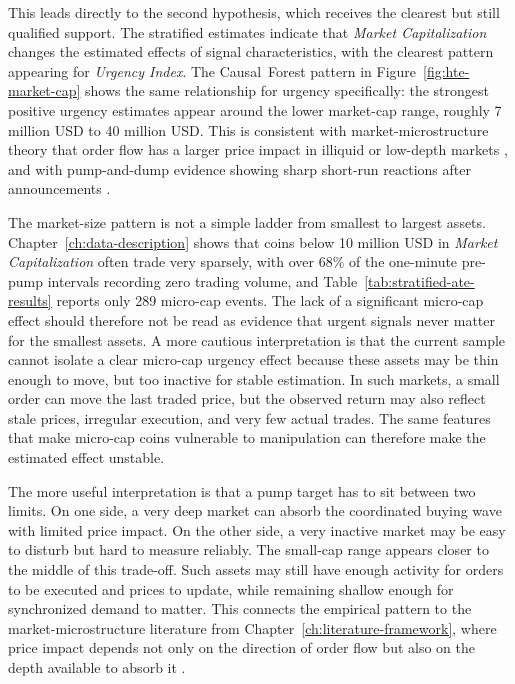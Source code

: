 This leads directly to the second hypothesis, which receives the clearest but still qualified support. The stratified estimates indicate that \textit{Market Capitalization} changes the estimated effects of signal characteristics, with the clearest pattern appearing for \textit{Urgency Index}. The Causal~Forest pattern in Figure~\ref{fig:hte-market-cap} shows the same relationship for urgency specifically: the strongest positive urgency estimates appear around the lower market-cap range, roughly 7 million USD to 40 million USD. This is consistent with market-microstructure theory that order flow has a larger price impact in illiquid or low-depth markets \cite{amihud2002illiquidity, kyle1985continuous}, and with pump-and-dump evidence showing sharp short-run reactions after announcements \cite{li2021cryptocurrency, hamrick2021examination}.

The market-size pattern is not a simple ladder from smallest to largest assets. Chapter~\ref{ch:data-description} shows that coins below 10 million USD in \textit{Market Capitalization} often trade very sparsely, with over 68\% of the one-minute pre-pump intervals recording zero trading volume, and Table~\ref{tab:stratified-ate-results} reports only 289 micro-cap events. The lack of a significant micro-cap effect should therefore not be read as evidence that urgent signals never matter for the smallest assets. A more cautious interpretation is that the current sample cannot isolate a clear micro-cap urgency effect because these assets may be thin enough to move, but too inactive for stable estimation. In such markets, a small order can move the last traded price, but the observed return may also reflect stale prices, irregular execution, and very few actual trades. The same features that make micro-cap coins vulnerable to manipulation can therefore make the estimated effect unstable.

The more useful interpretation is that a pump target has to sit between two limits. On one side, a very deep market can absorb the coordinated buying wave with limited price impact. On the other side, a very inactive market may be easy to disturb but hard to measure reliably. The small-cap range appears closer to the middle of this trade-off. Such assets may still have enough activity for orders to be executed and prices to update, while remaining shallow enough for synchronized demand to matter. This connects the empirical pattern to the market-microstructure literature from Chapter~\ref{ch:literature-framework}, where price impact depends not only on the direction of order flow but also on the depth available to absorb it \cite{amihud2002illiquidity, kyle1985continuous}.

